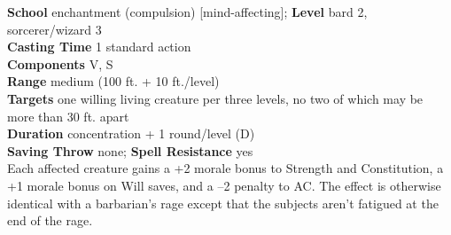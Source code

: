 \textbf{School} enchantment (compulsion) [mind-affecting]; \textbf{Level} bard 2, sorcerer/wizard 3\\
\textbf{Casting Time} 1 standard action\\
\textbf{Components} V, S\\
\textbf{Range }medium (100 ft. + 10 ft./level)\\
\textbf{Targets} one willing living creature per three levels, no two of which may be more than 30 ft. apart\\
\textbf{Duration} concentration + 1 round/level (D)\\
\textbf{Saving Throw} none; \textbf{Spell Resistance} yes\\
Each affected creature gains a +2 morale bonus to Strength and Constitution, a +1 morale bonus on Will saves, and a --2 penalty to AC. The effect is otherwise identical with a barbarian's rage except that the subjects aren't fatigued at the end of the rage.\\
